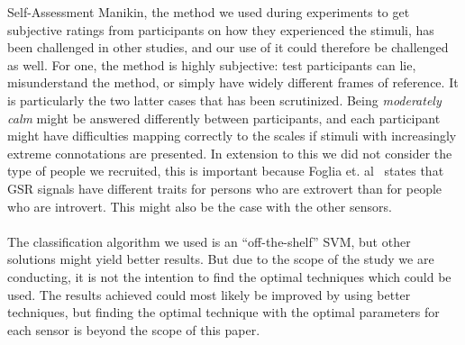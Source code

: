 Self-Assessment Manikin, the method we used during experiments to get subjective
ratings from participants on how they experienced the stimuli, has been
challenged in other studies, and our use of it could therefore be challenged as
well. For one, the method is highly subjective: test participants can lie,
misunderstand the method, or simply have widely different frames of
reference. It is particularly the two latter cases that has been
scrutinized. Being \textit{moderately calm} might be answered differently 
between participants, and each participant might have difficulties mapping
correctly to the scales if stimuli with increasingly extreme connotations are
presented.
In extension to this we did not consider the type of people we recruited, this is important because Foglia et. al~\cite{extrovsintro} states that GSR signals have different traits for persons who are extrovert than for people who are introvert. This might also be the case with the other sensors.
\\\\
The classification algorithm we used is an ``off-the-shelf'' SVM, but other solutions might yield better results.
But due to the scope of the study we are conducting, it is not the intention to find the optimal techniques which could be used.
The results achieved could most likely be improved by using better techniques, but finding the optimal technique with the optimal parameters for each sensor is beyond the scope of this paper.


